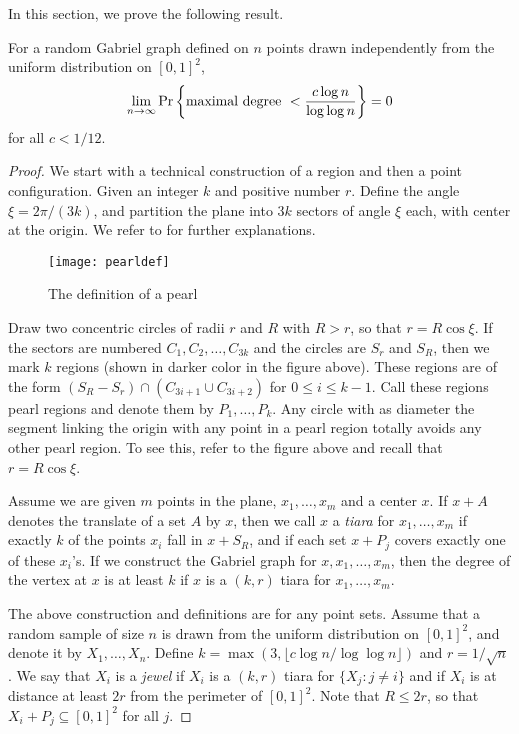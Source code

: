 \documentclass[lotsofwhite,charterfonts]{patmorin}
\newcommand{\PROB}{\Pr}
\begin{document}
In this section, we prove the following result.

\begin{thm}
For a random Gabriel graph defined on $n$ points drawn
independently from the uniform distribution on
$[0,1]^2$, 
$$
\lim_{n\to\infty} \PROB \left\{ \hbox{\rm maximal degree}~< {c \log n \over
\log \log n} \right\} = 0
$$
for all $c < 1/12$.
\end{thm}

\begin{proof}
We start with a technical construction of a region
and then a point configuration.
Given an integer $k$ and positive number $r$.
Define the angle $\xi = 2\pi / (3k)$,
and partition the plane into $3k$ sectors
of angle $\xi$ each, with center at the origin.
We refer to  for further explanations.

\begin{figure}[htbp]
\begin{center}\texttt{[image: pearldef]}\end{center}
\caption{The definition of a pearl}
\end{figure}

Draw two concentric circles of radii $r$ and $R$
with $R > r$, so that $r = R \cos \xi$.
If the sectors are numbered $C_1, C_2, \ldots, C_{3k}$
and the circles are $S_r$ and $S_R$, then we
mark $k$ regions (shown in darker color in the figure
above). These regions are of the form
$(S_R - S_r) \cap (C_{3i+1} \cup C_{3i+2})$ for
$0 \le i \le k-1$. 
Call these regions pearl regions
and denote them by $P_1 , \ldots, P_k$.
Any circle with
as diameter the segment linking the origin with
any point in a pearl region totally avoids any other
pearl region. To see this, refer to the figure
above and recall that $r = R \cos \xi$.

Assume we are given $m$ points in the plane,
$x_1,\ldots,x_m$ and a center $x$.
If $x+A$ denotes the translate of a set $A$ by $x$,
then we call $x$ a {\it tiara} for $x_1 , \ldots , x_m$
if exactly $k$ of the points $x_i$ fall in $x+S_R$,
and if each set $x+P_j$ covers exactly one of
these $x_i$'s.
If we construct the Gabriel graph for $x,x_1,\ldots,x_m$,
then the degree of the vertex at $x$ is at least $k$
if $x$ is a $(k,r)$ tiara for $x_1,\ldots,x_m$.

The above construction and definitions are
for any point sets.
Assume that a random sample of size $n$ is drawn
from the uniform distribution on $[0,1]^2$,
and denote it by $X_1 , \ldots, X_n$.
Define $k = \max( 3, \lfloor c \log n / \log \log n \rfloor)$
and $r = 1/\sqrt{n}$.
We say that $X_i$ is a {\it jewel}
if $X_i$ is a $(k,r)$ tiara for $\{ X_j : j \not= i \}$
and if $X_i$ is at distance at least $2r$ from the
perimeter of $[0,1]^2$. Note that $R \le 2r$, so that
$X_i + P_j \subseteq [0,1]^2$ for all $j$.


\end{proof}
\end{document}
